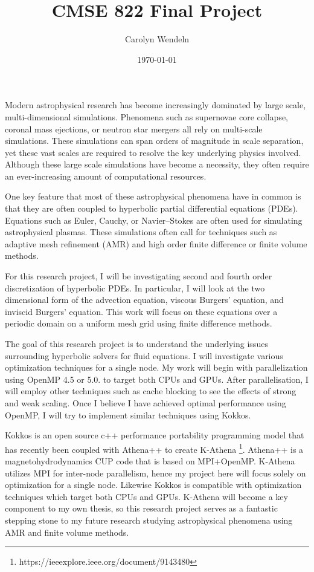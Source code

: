 \documentclass{article}
\title{CMSE 822 Final Project }
\author{Carolyn Wendeln}
\date{\today}
\begin{document}
\maketitle


Modern astrophysical research has become increasingly dominated by large scale, multi-dimensional simulations.
Phenomena such as supernovae core collapse, coronal mass ejections, or neutron star mergers all rely on multi-scale simulations.
These simulations can span orders of magnitude in scale separation, yet these vast scales are required to resolve the key underlying physics involved.
Although these large scale simulations have become a necessity, they often require an ever-increasing amount of computational resources.

One key feature that most of these astrophysical phenomena have in common is that they are often coupled to hyperbolic partial differential equations (PDEs).
Equations such as Euler, Cauchy, or Navier–Stokes are often used for simulating astrophysical plasmas.
These simulations often call for techniques such as adaptive mesh refinement (AMR) and high order finite difference or finite volume methods.

For this research project, I will be investigating second and fourth order discretization of hyperbolic PDEs.
In particular, I will look at the two dimensional form of the advection equation, viscous Burgers' equation, and inviscid Burgers' equation.
This work will focus on these equations over a periodic domain on a uniform mesh grid using finite difference methods.

The goal of this research project is to understand the underlying issues surrounding hyperbolic solvers for fluid equations.
I will investigate various optimization techniques for a single node.
My work will begin with parallelization using OpenMP 4.5 or 5.0. to target both CPUs and GPUs.
After parallelisation, I will employ other techniques such as cache blocking to see the effects of strong and weak scaling.
Once I believe I have achieved optimal performance using OpenMP, I will try to implement similar techniques using Kokkos.

Kokkos is an open source c++ performance portability programming model that has recently been coupled with Athena++ to create K-Athena \footnote[1]{https://ieeexplore.ieee.org/document/9143480}.
Athena++ is a magnetohydrodynamics CUP code that is based on MPI+OpenMP.
K-Athena utilizes MPI for inter-node parallelism, hence my project here will focus solely on optimization for a single node.
Likewise Kokkos is compatible with optimization techniques which target both CPUs and GPUs.
K-Athena will become a key component to my own thesis, so this research project serves as a fantastic stepping stone to my future research studying astrophysical phenomena using AMR and finite volume methods.






 
\end{document}
